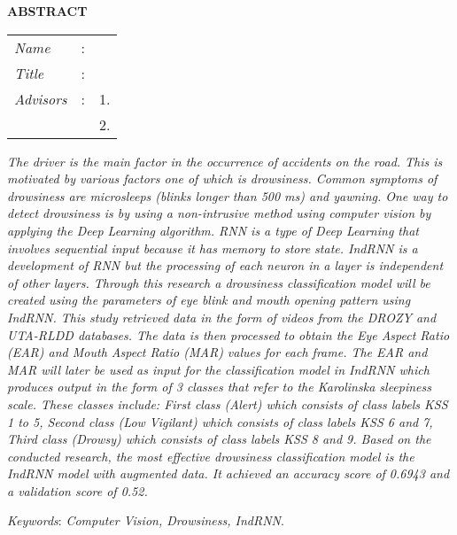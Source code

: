 \begin{center}
  \large\textbf{ABSTRACT}
\end{center}


\vspace{2ex}

\begingroup
\setlength{\tabcolsep}{0pt}

\noindent
\begin{tabularx}{\textwidth}{l >{\centering}m{3em} X}
  \emph{Name}     & : & \name{}         \\

  \emph{Title}    & : & \engtatitle{}   \\

  \emph{Advisors} & : & 1. \advisor{}   \\
                  &   & 2. \coadvisor{} \\
\end{tabularx}
\endgroup

\emph{The driver is the main factor in the occurrence of accidents on the road. This is motivated by
various factors one of which is drowsiness. Common symptoms of drowsiness are microsleeps
(blinks longer than 500 ms) and yawning. One way to detect drowsiness is by using a non-intrusive
method using computer vision by applying the Deep Learning algorithm. RNN is a type of Deep
Learning that involves sequential input because it has memory to store state. IndRNN is a 
development of RNN but the processing of each neuron in a layer is independent of other layers.
Through this research a drowsiness classification model will be created using the parameters
of eye blink and mouth opening pattern using IndRNN. This study retrieved data in the form of
videos from the DROZY and UTA-RLDD databases. The data is then processed to obtain the Eye
Aspect Ratio (EAR) and Mouth Aspect Ratio (MAR) values for each frame. The EAR and MAR will
later be used as input for the classification model in IndRNN which produces output in the
form of 3 classes that refer to the Karolinska sleepiness scale. These classes include: First
class (Alert) which consists of class labels KSS 1 to 5, Second class (Low Vigilant) which
consists of class labels KSS 6 and 7, Third class (Drowsy) which consists of class labels
KSS 8 and 9. Based on the conducted research, the most effective drowsiness classification model 
is the IndRNN model with augmented data. It achieved an accuracy score of 0.6943 and a validation 
score of 0.52.}

\emph{Keywords}: \emph{Computer Vision, Drowsiness, IndRNN}.
